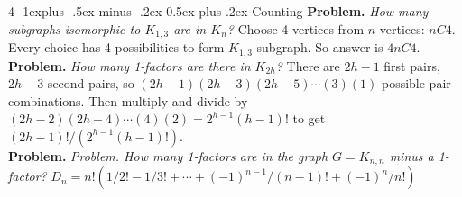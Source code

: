 \documentclass[letterpaper, 8pt]{extarticle}
\makeatletter
\renewcommand{\section}{\@startsection{section}{1}{0mm}%
	{-1explus -.5ex minus -.2ex}%
	{0.5ex plus .2ex}%
	{\normalfont\normalsize\bfseries}}
\makeatother
\begin{document}
\begin{multicols*}{4}
	\section{Counting}
	\textbf{Problem.} \textit{How many subgraphs isomorphic to $K_{1,3}$ are in $K_n$?} Choose 4 vertices from $n$ vertices: $nC4$. Every choice has 4 possibilities to form $K_{1,3}$ subgraph. So answer is $4 nC4$. \\
	\textbf{Problem.} \textit{How many 1-factors are there in $K_{2h}$?} There are $2h-1$ first pairs, $2h-3$ second pairs, so $(2h-1)(2h-3)(2h-5) \cdots (3)(1)$ possible pair combinations. Then multiply and divide by $(2h-2)(2h-4) \cdots (4)(2) = 2^{h-1}(h-1)!$ to get $(2h-1)!/(2^{h-1}(h-1)!)$. \\
	\textbf{Problem.} \textit{Problem. How many 1-factors are in the graph $G = K_{n,n}$ minus a 1-factor?}
	$D_n = n!(1/2! - 1/3! + \cdots + (-1)^{n-1}/(n-1)! + (-1)^n/n!)$

\end{multicols*}
\end{document}
